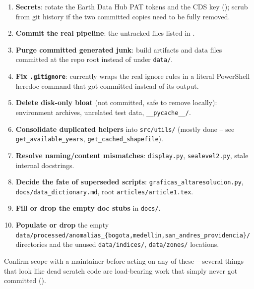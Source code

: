 \documentclass[11pt]{article}
\begin{document}
\begin{enumerate}[leftmargin=*]
\item \textbf{Secrets}: rotate the Earth Data Hub PAT tokens and the CDS
  key (); scrub from git history if the two committed
  copies need to be fully removed.
\item \textbf{Commit the real pipeline}: the untracked files listed in
  .
\item \textbf{Purge committed generated junk}: build artifacts and
  data files committed at the repo root instead of under \texttt{data/}.
\item \textbf{Fix \texttt{.gitignore}}: currently wraps the real ignore
  rules in a literal PowerShell heredoc command that got committed instead
  of its output.
\item \textbf{Delete disk-only bloat} (not committed, safe to remove
  locally): environment archives, unrelated test data, \texttt{\_\_pycache\_\_/}.
\item \textbf{Consolidate duplicated helpers} into \texttt{src/utils/}
  (mostly done -- see \texttt{get\_available\_years},
  \texttt{get\_cached\_shapefile}).
\item \textbf{Resolve naming/content mismatches}: \texttt{display.py},
  \texttt{sealevel2.py}, stale internal docstrings.
\item \textbf{Decide the fate of superseded scripts}:
  \texttt{graficas\_altaresolucion.py}, \texttt{docs/data\_dictionary.md},
  root \texttt{articles/article1.tex}.
\item \textbf{Fill or drop the empty doc stubs} in \texttt{docs/}.
\item \textbf{Populate or drop} the empty
  \texttt{data/processed/anomalias\_\{bogota,medellin,san\_andres\_providencia\}/}
  directories and the unused \texttt{data/indices/}, \texttt{data/zones/}
  locations.
\end{enumerate}

Confirm scope with a maintainer before acting on any of these -- several
things that look like dead scratch code are load-bearing work that simply
never got committed ().
\end{document}
